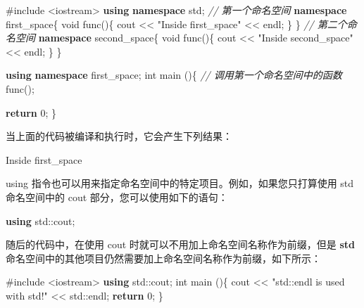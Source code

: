 \documentclass[
]{article}
\newenvironment{Shaded}{}{}
\newcommand{\BuiltInTok}[1]{#1}
\newcommand{\CommentTok}[1]{\textcolor[rgb]{0.38,0.63,0.69}{\textit{#1}}}
\newcommand{\ControlFlowTok}[1]{\textcolor[rgb]{0.00,0.44,0.13}{\textbf{#1}}}
\newcommand{\DataTypeTok}[1]{\textcolor[rgb]{0.56,0.13,0.00}{#1}}
\newcommand{\DecValTok}[1]{\textcolor[rgb]{0.25,0.63,0.44}{#1}}
\newcommand{\ImportTok}[1]{#1}
\newcommand{\KeywordTok}[1]{\textcolor[rgb]{0.00,0.44,0.13}{\textbf{#1}}}
\newcommand{\NormalTok}[1]{#1}
\newcommand{\OperatorTok}[1]{\textcolor[rgb]{0.40,0.40,0.40}{#1}}
\newcommand{\PreprocessorTok}[1]{\textcolor[rgb]{0.74,0.48,0.00}{#1}}
\newcommand{\StringTok}[1]{\textcolor[rgb]{0.25,0.44,0.63}{#1}}
\begin{document}
\begin{Shaded}
\begin{Highlighting}[]
\PreprocessorTok{\#include }\ImportTok{\textless{}iostream\textgreater{}}
\KeywordTok{using} \KeywordTok{namespace}\NormalTok{ std}\OperatorTok{;}
\CommentTok{// 第一个命名空间}
\KeywordTok{namespace}\NormalTok{ first\_space}\OperatorTok{\{}
   \DataTypeTok{void}\NormalTok{ func}\OperatorTok{()\{}
\NormalTok{      cout }\OperatorTok{\textless{}\textless{}} \StringTok{"Inside first\_space"} \OperatorTok{\textless{}\textless{}}\NormalTok{ endl}\OperatorTok{;}
   \OperatorTok{\}}
\OperatorTok{\}}
\CommentTok{// 第二个命名空间}
\KeywordTok{namespace}\NormalTok{ second\_space}\OperatorTok{\{}
   \DataTypeTok{void}\NormalTok{ func}\OperatorTok{()\{}
\NormalTok{      cout }\OperatorTok{\textless{}\textless{}} \StringTok{"Inside second\_space"} \OperatorTok{\textless{}\textless{}}\NormalTok{ endl}\OperatorTok{;}
   \OperatorTok{\}}
\OperatorTok{\}}

\KeywordTok{using} \KeywordTok{namespace}\NormalTok{ first\_space}\OperatorTok{;}
\DataTypeTok{int}\NormalTok{ main }\OperatorTok{()\{} 
   \CommentTok{// 调用第一个命名空间中的函数}
\NormalTok{   func}\OperatorTok{();}
   
   \ControlFlowTok{return} \DecValTok{0}\OperatorTok{;}
\OperatorTok{\}}
\end{Highlighting}
\end{Shaded}

当上面的代码被编译和执行时，它会产生下列结果：

\begin{Shaded}
\begin{Highlighting}[]
\NormalTok{Inside first\_space}
\end{Highlighting}
\end{Shaded}

using 指令也可以用来指定命名空间中的特定项目。例如，如果您只打算使用 std
命名空间中的 cout 部分，您可以使用如下的语句：

\begin{Shaded}
\begin{Highlighting}[]
\KeywordTok{using} \BuiltInTok{std::}\NormalTok{cout}\OperatorTok{;}
\end{Highlighting}
\end{Shaded}

随后的代码中，在使用 cout 时就可以不用加上命名空间名称作为前缀，但是
\textbf{std}
命名空间中的其他项目仍然需要加上命名空间名称作为前缀，如下所示：

\begin{Shaded}
\begin{Highlighting}[]
\PreprocessorTok{\#include }\ImportTok{\textless{}iostream\textgreater{}}
\KeywordTok{using} \BuiltInTok{std::}\NormalTok{cout}\OperatorTok{;}
\DataTypeTok{int}\NormalTok{ main }\OperatorTok{()\{}   
\NormalTok{    cout }\OperatorTok{\textless{}\textless{}} \StringTok{"std::endl is used with std!"} \OperatorTok{\textless{}\textless{}} \BuiltInTok{std::}\NormalTok{endl}\OperatorTok{;}      
    \ControlFlowTok{return} \DecValTok{0}\OperatorTok{;}
\OperatorTok{\}}
\end{Highlighting}
\end{Shaded}
\end{document}

